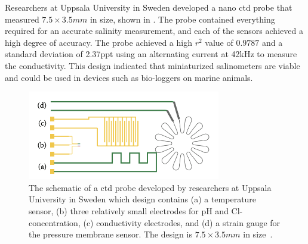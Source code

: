 Researchers at Uppsala University in Sweden developed a nano \gls{ctd} probe that measured $7.5 \times 3.5mm$ in size, shown in .
The probe contained everything required for an accurate salinity measurement, and each of the sensors achieved a high degree of accuracy.
The probe achieved a high $r^2$ value of $0.9787$ and a standard deviation of 2.37\gls{ppt} using an alternating current at 42kHz to measure the conductivity.
This design indicated that miniaturized salinometers are viable and could be used in devices such as bio-loggers on marine animals.~\cite{jonsson_chip_based_salinity_2013}
\begin{figure}[ht]
    \centering
    \includegraphics[width=0.75\textwidth]{Figures/nano_ctd}
    \caption{The schematic of a \gls{ctd} probe developed by researchers at Uppsala University in Sweden which design contains (a) a temperature sensor, (b) three relatively small electrodes for pH and Cl- concentration, (c) conductivity electrodes, and (d) a strain gauge for the pressure membrane sensor. The design is $7.5 \times 3.5 mm$ in size~\cite{jonsson_chip_based_salinity_2013}.}
    \label{fig:nano-ctd} %
\end{figure}


